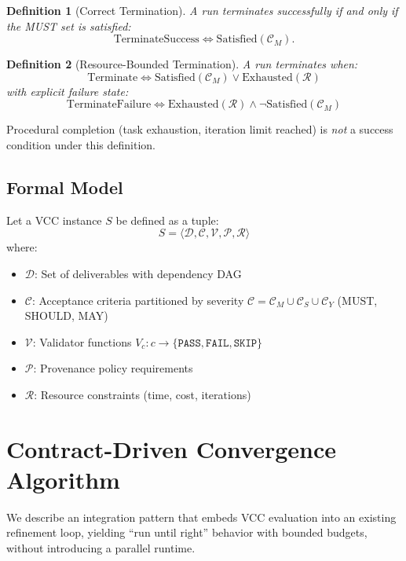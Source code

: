 \documentclass[11pt]{article}
\newtheorem{definition}{Definition}
\begin{document}
\begin{definition}[Correct Termination]
A run terminates successfully if and only if the MUST set is satisfied:
\[
\mathrm{TerminateSuccess} \iff \mathrm{Satisfied}(\mathcal{C}_M).
\]
\end{definition}

\begin{definition}[Resource-Bounded Termination]
A run terminates when:
\[
\mathrm{Terminate} \iff \mathrm{Satisfied}(\mathcal{C}_M) \lor \mathrm{Exhausted}(\mathcal{R})
\]
with explicit failure state:
\[
\mathrm{TerminateFailure} \iff \mathrm{Exhausted}(\mathcal{R}) \land \neg\mathrm{Satisfied}(\mathcal{C}_M)
\]
\end{definition}

Procedural completion (task exhaustion, iteration limit reached) is \emph{not} a success condition under this definition.

\subsection{Formal Model}
Let a VCC instance $S$ be defined as a tuple:
\[
S = \langle \mathcal{D}, \mathcal{C}, \mathcal{V}, \mathcal{P}, \mathcal{R} \rangle
\]
where:
\begin{itemize}[leftmargin=*]
  \item $\mathcal{D}$: Set of deliverables with dependency DAG
  \item $\mathcal{C}$: Acceptance criteria partitioned by severity $\mathcal{C} = \mathcal{C}_M \cup \mathcal{C}_S \cup \mathcal{C}_Y$ (MUST, SHOULD, MAY)
  \item $\mathcal{V}$: Validator functions $V_c: c \to \{\texttt{PASS}, \texttt{FAIL}, \texttt{SKIP}\}$
  \item $\mathcal{P}$: Provenance policy requirements
  \item $\mathcal{R}$: Resource constraints (time, cost, iterations)
\end{itemize}

\section{Contract-Driven Convergence Algorithm}
We describe an integration pattern that embeds VCC evaluation into an existing refinement loop, yielding ``run until right'' behavior with bounded budgets, without introducing a parallel runtime.
\end{document}
